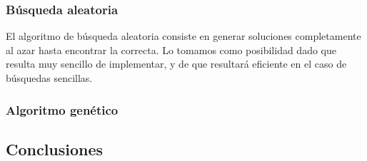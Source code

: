 \subsubsection{Búsqueda aleatoria}

El algoritmo de búsqueda aleatoria consiste en generar soluciones completamente al azar hasta encontrar la correcta. Lo tomamos como posibilidad dado que resulta muy sencillo de implementar, y de que resultará eficiente en el caso de búsquedas sencillas.


\subsubsection{Algoritmo genético}


\subsection{Conclusiones}

